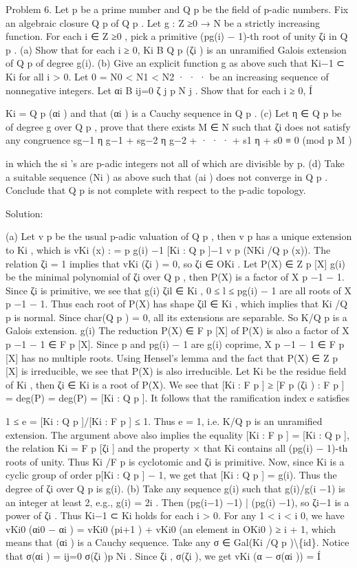 \documentclass[UTF8,12pt]{ctexart}
\begin{document}
Problem 6. Let p be a prime number and Q p be the field of p-adic numbers. Fix an algebraic closure Q p of Q p . Let g : Z ≥0 → N be a strictly increasing function. For each i ∈ Z ≥0 , pick a primitive (pg(i) − 1)-th root of unity ζi in Q p . (a) Show that for each i ≥ 0, Ki B Q p (ζi ) is an unramified Galois extension of Q p of degree g(i). (b) Give an explicit function g as above such that Ki−1 ⊂ Ki for all i > 0. Let 0 = N0 < N1 < N2 · · · be an increasing sequence of nonnegative integers. Let αi B ij=0 ζ j p N j . Show that for each i ≥ 0, Í

Ki = Q p (αi ) and that (αi ) is a Cauchy sequence in Q p . (c) Let η ∈ Q p be of degree g over Q p , prove that there exists M ∈ N such that ζi does not satisfy any congruence sg−1 η g−1 + sg−2 η g−2 + · · · + s1 η + s0 ≡ 0 (mod p M )

in which the si ’s are p-adic integers not all of which are divisible by p. (d) Take a suitable sequence (Ni ) as above such that (ai ) does not converge in Q p . Conclude that Q p is not complete with respect to the p-adic topology.

Solution:

(a) Let v p be the usual p-adic valuation of Q p , then v p has a unique extension to Ki , which is vKi (x) : = p g(i) −1 [Ki : Q p ]−1 v p (NKi /Q p (x)). The relation ζi = 1 implies that vKi (ζi ) = 0, so ζi ∈ OKi . Let P(X) ∈ Z p [X] g(i) be the minimal polynomial of ζi over Q p , then P(X) is a factor of X p −1 − 1. Since ζi is primitive, we see that g(i) ζil ∈ Ki , 0 ≤ l ≤ pg(i) − 1 are all roots of X p −1 − 1. Thus each root of P(X) has shape ζil ∈ Ki , which implies that Ki /Q p is normal. Since char(Q p ) = 0, all its extensions are separable. So K/Q p is a Galois extension. g(i) The reduction P(X) ∈ F p [X] of P(X) is also a factor of X p −1 − 1 ∈ F p [X]. Since p and pg(i) − 1 are g(i) coprime, X p −1 − 1 ∈ F p [X] has no multiple roots. Using Hensel’s lemma and the fact that P(X) ∈ Z p [X] is irreducible, we see that P(X) is also irreducible. Let Ki be the residue field of Ki , then ζi ∈ Ki is a root of P(X). We see that [Ki : F p ] ≥ [F p (ζi ) : F p ] = deg(P) = deg(P) = [Ki : Q p ]. It follows that the ramification index e satisfies

1 ≤ e = [Ki : Q p ]/[Ki : F p ] ≤ 1. Thus e = 1, i.e. K/Q p is an unramified extension. The argument above also implies the equality [Ki : F p ] = [Ki : Q p ], the relation Ki = F p [ζi ] and the property × that Ki contains all (pg(i) − 1)-th roots of unity. Thus Ki /F p is cyclotomic and ζi is primitive. Now, since Ki is a cyclic group of order p[Ki : Q p ] − 1, we get that [Ki : Q p ] = g(i). Thus the degree of ζi over Q p is g(i). (b) Take any sequence g(i) such that g(i)/g(i −1) is an integer at least 2, e.g., g(i) = 2i . Then (pg(i−1) −1) | (pg(i) −1), so ζi−1 is a power of ζi . Thus Ki−1 ⊂ Ki holds for each i > 0. For any 1 < i < i 0, we have vKi0 (αi0 − αi ) = vKi0 (pi+1 ) + vKi0 (an element in OKi0 ) ≥ i + 1, which means that (αi ) is a Cauchy sequence. Take any σ ∈ Gal(Ki /Q p )\textbackslash{}\{id\}. Notice that σ(αi ) = ij=0 σ(ζi )p Ni . Since ζi , σ(ζi ), we get vKi (α − σ(αi )) = Í
\end{document}

